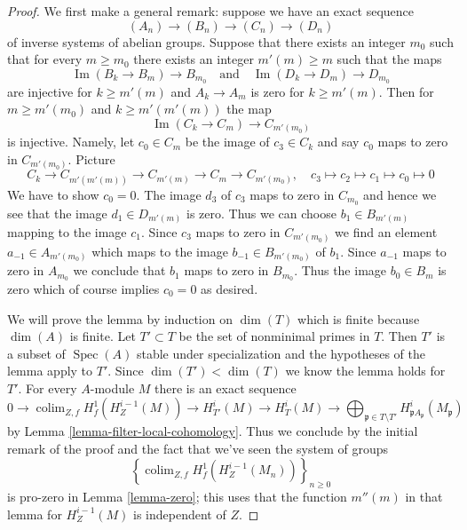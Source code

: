 \documentclass{stacks-project}
\theoremstyle{plain}
\theoremstyle{definition}
\theoremstyle{remark}
\numberwithin{equation}{subsection}
\def\colim{\mathop{\mathrm{colim}}\nolimits}
\def\Spec{\mathop{\mathrm{Spec}}}
\def\Im{\mathop{\mathrm{Im}}}
\begin{document}
\begin{proof}
We first make a general remark: suppose we have an exact
sequence
$$
(A_n) \to (B_n) \to (C_n) \to (D_n)
$$
of inverse systems of abelian groups. Suppose that there exists
an integer $m_0$ such that for every $m \geq m_0$
there exists an integer $m'(m) \geq m$ such that the maps
$$
\Im(B_k \to B_m) \longrightarrow B_{m_0}
\quad\text{and}\quad
\Im(D_k \to D_m) \longrightarrow D_{m_0}
$$
are injective for $k \geq m'(m)$ and $A_k \to A_m$ is zero
for $k \geq m'(m)$. Then for $m \geq m'(m_0)$ and $k \geq m'(m'(m))$
the map
$$
\Im(C_k \to C_m) \to C_{m'(m_0)}
$$
is injective. Namely, let $c_0 \in C_m$ be the image of $c_3 \in C_k$
and say $c_0$ maps to zero in $C_{m'(m_0)}$. Picture
$$
C_k \to C_{m'(m'(m))} \to C_{m'(m)} \to C_m \to C_{m'(m_0)},\quad
c_3 \mapsto c_2 \mapsto c_1 \mapsto c_0 \mapsto 0
$$
We have to show $c_0 = 0$.
The image $d_3$ of $c_3$ maps to zero in $C_{m_0}$ and hence
we see that the image $d_1 \in D_{m'(m)}$ is zero.
Thus we can choose $b_1 \in B_{m'(m)}$ mapping to
the image $c_1$. Since $c_3$ maps to zero in
$C_{m'(m_0)}$ we find an element $a_{-1} \in A_{m'(m_0)}$
which maps to the image $b_{-1} \in B_{m'(m_0)}$ of $b_1$.
Since $a_{-1}$ maps to zero in $A_{m_0}$ we conclude that
$b_1$ maps to zero in $B_{m_0}$. Thus the image $b_0 \in B_m$
is zero which of course implies $c_0 = 0$ as desired.

\medskip\noindent
We will prove the lemma by induction on $\dim(T)$ which is
finite because $\dim(A)$ is finite. Let $T' \subset T$ be
the set of nonminimal primes in $T$. Then $T'$ is a subset
of $\Spec(A)$ stable under specialization and the hypotheses
of the lemma apply to $T'$. Since $\dim(T') < \dim(T)$ we know
the lemma holds for $T'$. For every $A$-module $M$ there is an
exact sequence
$$
0 \to \colim_{Z, f} H^1_f(H^{i - 1}_Z(M)) \to
H^i_{T'}(M) \to H^i_T(M) \to
\bigoplus\nolimits_{\mathfrak p \in T \setminus T'}
H^i_{\mathfrak p A_\mathfrak p}(M_\mathfrak p)
$$
by Lemma \ref{lemma-filter-local-cohomology}.
Thus we conclude by the initial remark of the proof
and the fact that we've seen the system of groups
$$
\left\{\colim_{Z, f} H^1_f(H^{i - 1}_Z(M_n))\right\}_{n \geq 0}
$$
is pro-zero in Lemma \ref{lemma-zero}; this uses that the function
$m''(m)$ in that lemma for $H^{i - 1}_Z(M)$ is independent of $Z$.
\end{proof}
\end{document}
